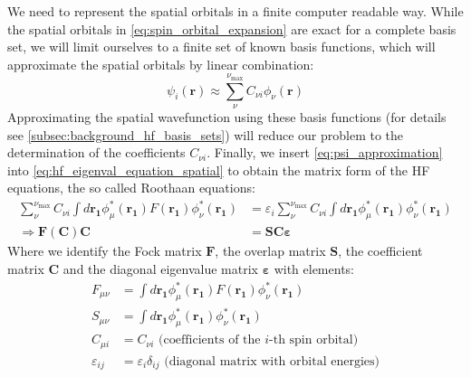 We need to represent the spatial orbitals in a finite computer readable way. While the spatial orbitals in \autoref{eq:spin_orbital_expansion} are exact for a complete basis set, we will limit ourselves to a finite set of known basis functions, which will approximate the spatial orbitals by linear combination:
\begin{equation}
    \label{eq:psi_approximation}
    \psi_i(\mathbf{r}) \approx \sum_{\nu}^{\nu_\text{max}} C_{\nu i} \phi_\nu(\mathbf{r})
\end{equation}
Approximating the spatial wavefunction using these basis functions (for details see \autoref{subsec:background_hf_basis_sets}) will reduce our problem to the determination of the coefficients $C_{\nu i}$. Finally, we insert \autoref{eq:psi_approximation} into \autoref{eq:hf_eigenval_equation_spatial} to obtain the matrix form of the HF equations, the so called Roothaan equations:
\begin{subequations}
    \label{eq:roothaan_equations}
    \begin{align}
        \sum_{\nu}^{\nu_\text{max}} C_{\nu i} \int d\mathbf{r_1} \phi_\mu^*(\mathbf{r_1}) F(\mathbf{r_1}) \phi_\nu^*(\mathbf{r_1})&= \varepsilon_i \sum_{\nu}^{\nu_\text{max}} C_{\nu i} \int d\mathbf{r_1} \phi_\mu^*(\mathbf{r_1})\phi_\nu^*(\mathbf{r_1}) \\
        \Rightarrow \mathbf{F(C)C} &= \mathbf{SC} \boldsymbol{\varepsilon} \label{eq:roothaan_equations_matrix}
    \end{align}
\end{subequations}
Where we identify the Fock matrix $\mathbf{F}$, the overlap matrix $\mathbf{S}$, the coefficient matrix $\mathbf{C}$ and the diagonal eigenvalue matrix $\boldsymbol{\varepsilon}$ with elements: 
\begin{subequations}
    \label{eq:roothaan_matrices}
    \begin{align}
        F_{\mu \nu} &= \int d\mathbf{r_1} \phi_\mu^*(\mathbf{r_1}) F(\mathbf{r_1}) \phi_\nu^*(\mathbf{r_1}) \label{eq:roothaan_mat_F}\\
        S_{\mu \nu} &= \int d\mathbf{r_1} \phi_\mu^*(\mathbf{r_1}) \phi_\nu^*(\mathbf{r_1}) \\
        C_{\mu i} &= C_{\nu i} \text{ (coefficients of the } i\text{-th spin orbital)}\\
        \varepsilon_{ij} &= \varepsilon_i \delta_{ij} \text{ (diagonal matrix with orbital energies)}
    \end{align}
\end{subequations}
